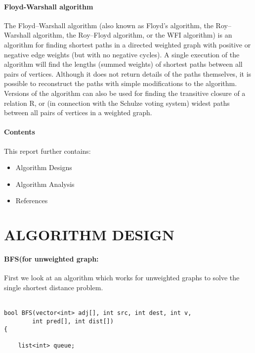 \documentclass[10pt]{article}
\begin{document}
\begin{multicols*}{2}
\paragraph{Floyd-Warshall algorithm}
The Floyd–Warshall algorithm (also known as Floyd's algorithm, the Roy–Warshall algorithm, the Roy–Floyd algorithm, or the WFI algorithm) is an algorithm for finding shortest paths in a directed weighted graph with positive or negative edge weights (but with no negative cycles). A single execution of the algorithm will find the lengths (summed weights) of shortest paths between all pairs of vertices. Although it does not return details of the paths themselves, it is possible to reconstruct the paths with simple modifications to the algorithm. Versions of the algorithm can also be used for finding the transitive closure of a relation R, or (in connection with the Schulze voting system) widest paths between all pairs of vertices in a weighted graph.

\paragraph{Contents}
This report further contains:
\begin{itemize}
\item 	Algorithm  Designs
\item 	Algorithm  Analysis
\item 	References
\end{itemize}

\newpage

\section*{ALGORITHM DESIGN}

\paragraph{BFS(for unweighted graph:}
First we look at an algorithm which works for unweighted graphs to solve the single shortest distance problem.\\\\

\begin{lstlisting}
bool BFS(vector<int> adj[], int src, int dest, int v,
		int pred[], int dist[])
{

	list<int> queue;


\end{lstlisting}
\end{multicols*}
\end{document}
